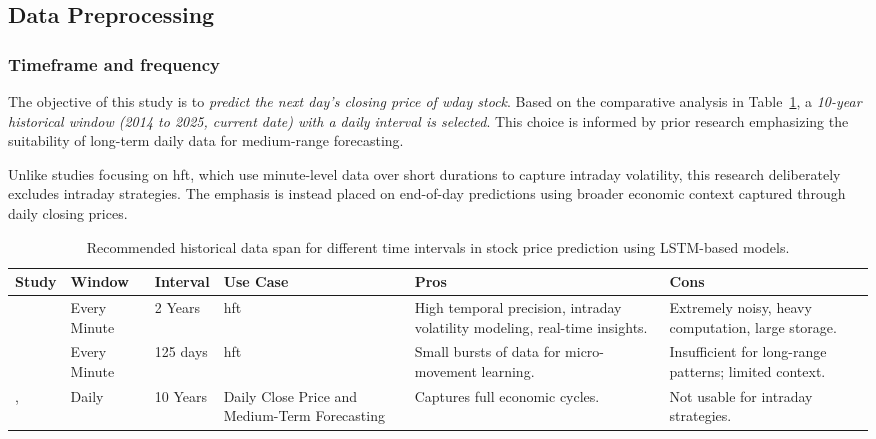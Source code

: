 \begin{landscape}
\subsection{Data Preprocessing}

\subsubsection{Timeframe and frequency}

The objective of this study is to \emph{predict the next day’s closing price of
\acrfull{wday} stock}. Based on the comparative analysis in 
Table~\ref{tab:data-window}, a \emph{10-year historical window (2014 to 2025, 
current date) with a daily interval is selected}. This choice is informed by prior 
research emphasizing the suitability of long-term daily data for medium-range 
forecasting.

Unlike studies focusing on \acrfull{hft}, which use minute-level data over short 
durations to capture intraday volatility, this research deliberately excludes 
intraday strategies. The emphasis is instead placed on end-of-day predictions using 
broader economic context captured through daily closing prices.

\begin{table}[H]
\centering
\caption{Recommended historical data span for different time intervals in stock price prediction using LSTM-based models.}
\label{tab:data-window}
\begin{tabular}{p{3cm}llp{3cm}p{6cm}p{6cm}} \hline
     \textbf{Study} & \textbf{Window} & \textbf{Interval} & \textbf{Use Case} & \textbf{Pros}  & \textbf{Cons} \\ \hline\hline
     \parencite{shaban2024SMPDL} & Every Minute & 2 Years & 
     \acrfull{hft} &
     High temporal precision, intraday volatility modeling, real-time insights. &
     Extremely noisy, heavy computation, large storage.
     \\
     \parencite{guo2024LSTMStock} & Every Minute & 125 days & 
     \acrfull{hft} &
      Small bursts of data for micro-movement learning. &
      Insufficient for long-range patterns; limited context.
      \\
      \parencite{chang2024StockPrediction}, 
      \parencite{nabipour2020DeepLearning} & Daily & 10 Years & 
      Daily Close Price and Medium-Term Forecasting &
      Captures full economic cycles. &
      Not usable for intraday strategies.
     \\
     \hline
\end{tabular}
\end{table}
\end{landscape}

